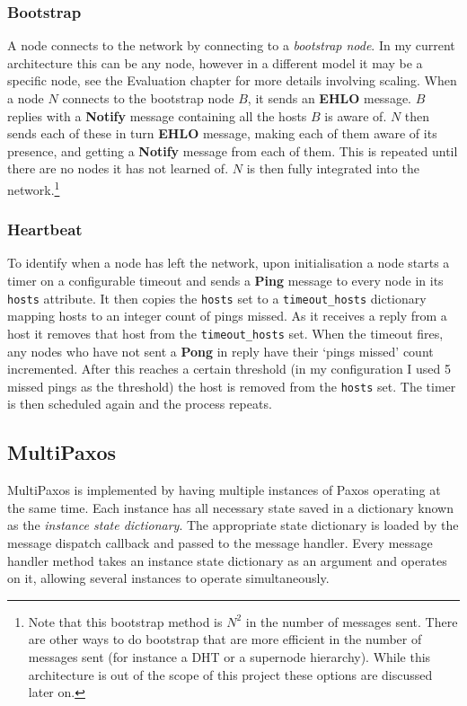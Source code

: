 \documentclass[12pt,twoside,notitlepage]{report}
\newcommand{\msg}[1] {{\bf #1}}         %
\begin{document}

\subsubsection{Bootstrap}

A node connects to the network by connecting to a \emph{bootstrap node}. In my current
architecture this can be any node, however in a different model it may be a specific node, see the
Evaluation chapter for more details involving scaling. When a node $N$ connects to the bootstrap
node $B$, it sends an \msg{EHLO} message. $B$ replies with a \msg{Notify} message containing all the
hosts $B$ is aware of. $N$ then sends each of these in turn \msg{EHLO} message, making each of them
aware of its presence, and getting a \msg{Notify} message from each of them. This is repeated until
there are no nodes it has not learned of. $N$ is then fully integrated into the network.\footnote{
Note that this bootstrap method is $N^2$ in the number of messages sent. There are other ways to
do bootstrap that are more efficient in the number of messages sent (for instance a DHT or a
supernode hierarchy). While this architecture is out of the scope of this project these options are
discussed later on.}

\subsubsection{Heartbeat}

To identify when a node has left the network, upon initialisation a node starts a timer on a
configurable timeout and sends a \msg{Ping} message to every node in its \verb+hosts+ attribute.
It then copies the \verb+hosts+ set to a \verb+timeout_hosts+ dictionary mapping hosts to an
integer count of pings missed. As it receives a reply from a host it removes that host from the
\verb+timeout_hosts+ set. When the timeout fires, any nodes who have not sent a \msg{Pong} in
reply have their `pings missed' count incremented. After this reaches a certain threshold (in my
configuration I used 5 missed pings as the threshold) the host is removed from the \verb+hosts+
set. The timer is then scheduled again and the process repeats.

\subsection{MultiPaxos}

MultiPaxos is implemented by having multiple instances of Paxos operating at the same time. Each
instance has all necessary state saved in a dictionary known as the \emph{instance state
dictionary}. The appropriate state dictionary is loaded by the message dispatch callback and
passed to the message handler. Every message handler method takes an instance state dictionary as
an argument and operates on it, allowing several instances to operate simultaneously.
\end{document}
